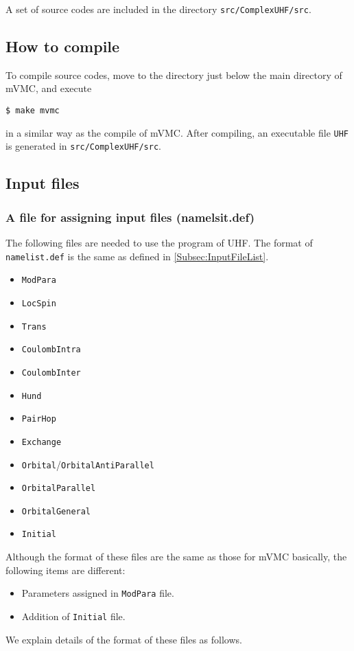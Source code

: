 A set of source codes are included in the directory \verb|src/ComplexUHF/src|.

\subsection{How to compile}

To compile source codes, move to the directory just below the main directory of mVMC, and execute
\begin{verbatim}
$ make mvmc
\end{verbatim}
in a similar way as the compile of mVMC.
After compiling, an executable file \verb|UHF| is generated in \verb|src/ComplexUHF/src|.

\subsection{Input files}

\subsubsection{A file for assigning input files (namelsit.def)}

The following files are needed to use the program of UHF.
The format of \verb|namelist.def| is the same as defined in \ref{Subsec:InputFileList}.\\
\begin{itemize}
\item{\verb|ModPara|}
\item{\verb|LocSpin|}
\item{\verb|Trans|}
\item{\verb|CoulombIntra|}
\item{\verb|CoulombInter|}
\item{\verb|Hund|}
\item{\verb|PairHop|}
\item{\verb|Exchange|}
\item{\verb|Orbital|/\verb|OrbitalAntiParallel|}
\item{\verb|OrbitalParallel|}
\item{\verb|OrbitalGeneral|}
\item{\verb|Initial|}
\end{itemize}
Although the format of these files are the same as those for mVMC basically, the following items are different:
 \begin{itemize}
 \item{Parameters assigned in \verb|ModPara| file.}
 \item{Addition of \verb|Initial| file.}
 \end{itemize}
We explain details of the format of these files as follows.

